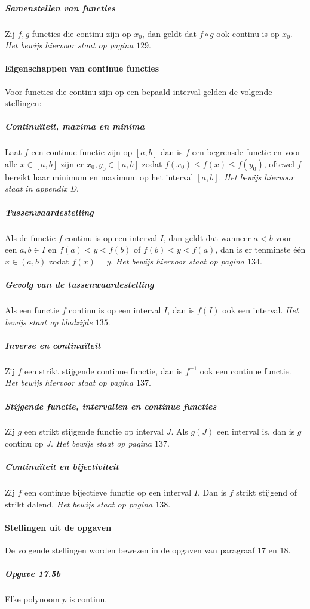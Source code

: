 \subparagraph{Samenstellen van functies} Zij $f,g$ functies die continu zijn op $x_{0}$, dan geldt dat $f \circ g$ ook continu is op $x_{0}$. \textit{Het bewijs hiervoor staat op pagina $129$}.

\paragraph{Eigenschappen van continue functies} Voor functies die continu zijn op een bepaald interval gelden de volgende stellingen:

\subparagraph{Continuïteit, maxima en minima} Laat $f$ een continue functie zijn op $[a,b]$ dan is $f$ een begrensde functie en voor alle $x\in[a,b]$ zijn er $x_{0},y_{0}\in[a,b]$ zodat $f(x_{0}) \leq f(x) \leq f(y_{0})$, oftewel $f$ bereikt haar minimum en maximum op het interval $[a,b]$. \textit{Het bewijs hiervoor staat in appendix D}.

\subparagraph{Tussenwaardestelling} Als de functie $f$ continu is op een interval $I$, dan geldt dat wanneer $a<b$ voor een $a,b \in I$ en $f(a)<y<f(b)$ of $f(b)<y<f(a)$, dan is er tenminste één $x\in(a,b)$ zodat $f(x)=y$. \textit{Het bewijs hiervoor staat op pagina $134$}.

\subparagraph{Gevolg van de tussenwaardestelling} Als een functie $f$ continu is op een interval $I$, dan is $f(I)$ ook een interval. \textit{Het bewijs staat op bladzijde $135$}.

\subparagraph{Inverse en continuïteit} Zij $f$ een strikt stijgende continue functie, dan is $f^{-1}$ ook een continue functie. \textit{Het bewijs hiervoor staat op pagina $137$}.

\subparagraph{Stijgende functie, intervallen en continue functies} Zij $g$ een strikt stijgende functie op interval $J$. Als $g(J)$ een interval is, dan is $g$ continu op $J$. \textit{Het bewijs staat op pagina $137$}.

\subparagraph{Continuïteit en bijectiviteit} Zij $f$ een continue bijectieve functie op een interval $I$. Dan is $f$ strikt stijgend of strikt dalend. \textit{Het bewijs staat op pagina $138$}.

\paragraph{Stellingen uit de opgaven} De volgende stellingen worden bewezen in de opgaven van paragraaf $17$ en $18$.

\subparagraph{Opgave 17.5b} Elke polynoom $p$ is continu.
